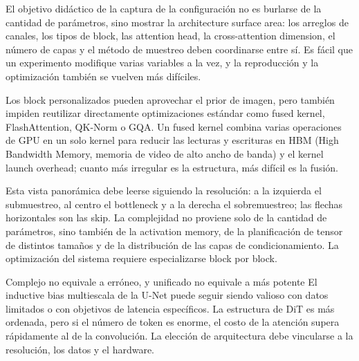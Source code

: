 
El objetivo didáctico de la captura de la configuración no es burlarse de la cantidad de parámetros, sino mostrar la architecture surface area: los arreglos de canales, los tipos de block, las attention head, la cross-attention dimension, el número de capas y el método de muestreo deben coordinarse entre sí. Es fácil que un experimento modifique varias variables a la vez, y la reproducción y la optimización también se vuelven más difíciles.


Los block personalizados pueden aprovechar el prior de imagen, pero también impiden reutilizar directamente optimizaciones estándar como fused kernel, FlashAttention, QK-Norm o GQA. Un fused kernel combina varias operaciones de GPU en un solo kernel para reducir las lecturas y escrituras en HBM (High Bandwidth Memory, memoria de video de alto ancho de banda) y el kernel launch overhead; cuanto más irregular es la estructura, más difícil es la fusión.


Esta vista panorámica debe leerse siguiendo la resolución: a la izquierda el submuestreo, al centro el bottleneck y a la derecha el sobremuestreo; las flechas horizontales son las skip. La complejidad no proviene solo de la cantidad de parámetros, sino también de la activation memory, de la planificación de tensor de distintos tamaños y de la distribución de las capas de condicionamiento. La optimización del sistema requiere especializarse block por block.

\begin{warningbox}{Complejo no equivale a erróneo, y unificado no equivale a más potente}
El inductive bias multiescala de la U-Net puede seguir siendo valioso con datos limitados o con objetivos de latencia específicos. La estructura de DiT es más ordenada, pero si el número de token es enorme, el costo de la atención supera rápidamente al de la convolución. La elección de arquitectura debe vincularse a la resolución, los datos y el hardware.
\end{warningbox}

